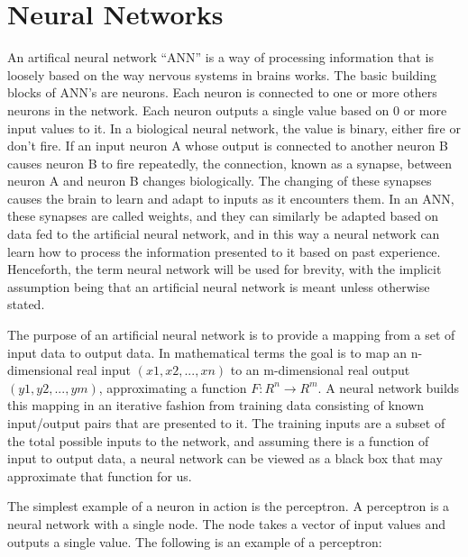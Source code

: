\chapter[Neural Networks]{Neural Networks}
An artifical neural network ``ANN'' is a way of processing information that is loosely based on the way nervous systems in brains works. The basic building
blocks of ANN's are neurons. Each neuron is connected to one or more others neurons in the network. Each neuron outputs a single value based on 0 or more input values to it. In a biological neural network, the value is binary, either fire or don't fire. If an input neuron A whose output is connected to another neuron B causes neuron B to fire repeatedly, the connection, known as a synapse, between neuron A and neuron B changes biologically. The changing of these synapses causes the brain to learn and adapt to inputs as it encounters them. In an ANN, these synapses are called weights, and they can similarly be adapted based on data fed to the artificial neural network, and in this way a neural network can learn how to process the information presented to it based on past experience. Henceforth, the term neural network will be used for brevity, with the implicit assumption being that an artificial neural network is meant unless otherwise stated.

The purpose of an artificial neural network is to provide a mapping from a set of input data to output data. 
In mathematical terms the goal is to map an n-dimensional real input
\begin{math}(x1,x2,...,xn)\end{math} to an m-dimensional real output \begin{math}(y1,y2,...,ym)\end{math}, 
approximating a function \begin{math} F : R^n \rightarrow R^m. \end{math}\cite{rojas1} 
A neural network builds this mapping in an iterative fashion from training data consisting of known input/output pairs that are presented to it. The training inputs are a subset of the total possible inputs to the network, and assuming there is a function of input to output data, a neural network can be viewed as a black box that may approximate that function for us.




The simplest example of a neuron in action is the perceptron. A perceptron is a neural network with a single node. The node takes a vector of input values and outputs a single value. The following is an example of a perceptron: 

